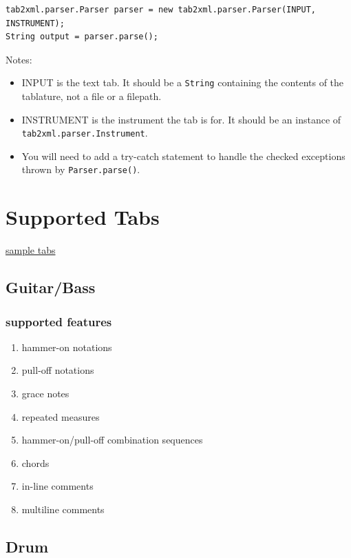 \documentclass[11pt]{article}
\begin{document}
\begin{verbatim}
tab2xml.parser.Parser parser = new tab2xml.parser.Parser(INPUT, INSTRUMENT);  
String output = parser.parse();  
\end{verbatim}

Notes:
\begin{itemize}
\item INPUT is the text tab.  It should be a \texttt{String} containing the contents of the tablature, not a file or a filepath.
\item INSTRUMENT is the instrument the tab is for.  It should be an instance of \texttt{tab2xml.parser.Instrument}.
\item You will need to add a try-catch statement to handle the checked exceptions thrown by \texttt{Parser.parse()}.
\end{itemize}

\section{Supported Tabs}
\label{sec:org2de12cd}
\href{https://github.com/ahopk127/eecs2311-tab2xml/tree/develop/src/test/resources}{sample tabs}
\subsection{Guitar/Bass}
\label{sec:org3e926a8}
\subsubsection{supported features}
\label{sec:org39899d1}
\begin{enumerate}
\item hammer-on notations
\item pull-off notations
\item grace notes
\item repeated measures
\item hammer-on/pull-off combination sequences
\item chords
\item in-line comments
\item multiline comments
\end{enumerate}

\subsection{Drum}
\label{sec:org27cd36c}
\end{document}
